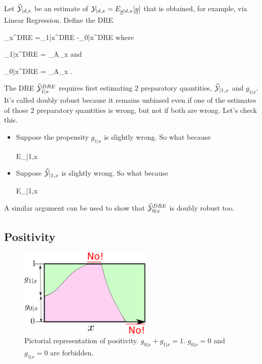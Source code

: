 Let
${\widehat{{\cal Y}}}_{|d, x}$
be an estimate
of $\caly_{|d, x}
=E_{\rvy|d,x}[\rvy]$
that is
obtained, for
example, via Linear Regression.
Define the DRE

\beq
{}_x^{DRE}
=\HAT{\caly}_{1|x}^{DRE}
-\HAT{\caly}_{0|x}^{DRE}
\eeq
where

\beq
\HAT{\caly}_{1|x}^{DRE}
=
\sum_{\s\in A_x}
\eeq
and

\beq
\HAT{\caly}_{0|x}^{DRE}
=
\sum_{\s\in A_x}
\;.
\eeq

The DRE
${\widehat{{\cal Y}}}_{1|x}^{DRE}$
requires first
estimating
2 preparatory quantities,
 ${\widehat{{\cal Y}}}_{|1, x}$
and $g_{1|x}$.
It's
called doubly robust
because it
remains unbiased
even if one
of the
estimates
of those 2
preparatory quantities is wrong,
but not if
both are wrong.
Let's check this.

\begin{itemize}
\item Suppose the propensity
$g_{1|x}$ is slightly wrong.
So what because


\beq
E_{\s|1,x}
\eeq

\item Suppose
${\widehat{{\cal Y}}}_{|1, x}$ is
slightly wrong. So what because

\beq
E_{\s|1,x}
\eeq

\end{itemize}A similar argument
can be used
to show that
${\widehat{{\cal Y}}}_{0|x}^{DRE}$
is doubly robust too.


\subsection{Positivity}

\begin{figure}[h!]
\centering
\includegraphics[width=2.5in]
{pot-out/po-positivity}
\caption{Pictorial
representation of positivity.
$g_{0|x}+g_{1|x}=1$.
$g_{0|x}=0$
and
$g_{1|x}=0$ are forbidden.}
\label{fig-po-positivity}
\end{figure}



